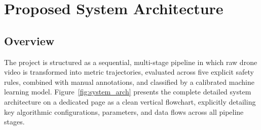 \chapter{Proposed System Architecture}
\label{chap:proposed}

\section{Overview}

The project is structured as a sequential, multi-stage pipeline in which raw drone video is transformed into metric trajectories, evaluated across five explicit safety rules, combined with manual annotations, and classified by a calibrated machine learning model. Figure~\ref{fig:system_arch} presents the complete detailed system architecture on a dedicated page as a clean vertical flowchart, explicitly detailing key algorithmic configurations, parameters, and data flows across all pipeline stages.

